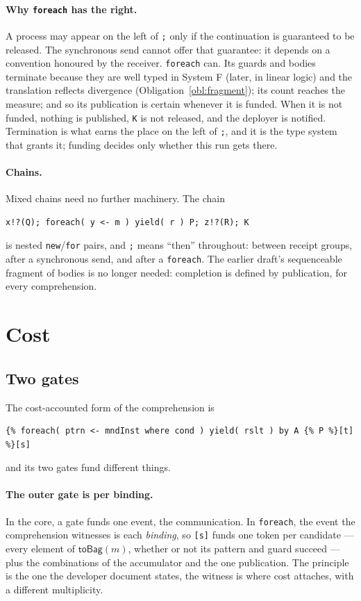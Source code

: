 \documentclass[11pt]{article}
\theoremstyle{branddef}
\theoremstyle{brandplain}
\theoremstyle{brandrem}
\newcommand{\fe}{\texttt{foreach}}
\begin{document}
\paragraph{Why \fe{} has the right.} A process may appear on the left of
\texttt{;} only if the continuation is guaranteed to be released. The
synchronous send cannot offer that guarantee: it depends on a convention
honoured by the receiver. \fe{} can. Its guards and bodies terminate because
they are well typed in System F (later, in linear logic) and the translation
reflects divergence (Obligation~\ref{obl:fragment}); its count reaches the
measure; and so its publication is certain whenever it is funded. When it is
not funded, nothing is published, \texttt{K} is not released, and the deployer
is notified. Termination is what earns the place on the left of \texttt{;}, and
it is the type system that grants it; funding decides only whether this run
gets there.

\paragraph{Chains.} Mixed chains need no further machinery. The chain
\begin{lstlisting}
x!?(Q); foreach( y <- m ) yield( r ) P; z!?(R); K
\end{lstlisting}
is nested \texttt{new}/\texttt{for} pairs, and \texttt{;} means ``then''
throughout: between receipt groups, after a synchronous send, and after a
\fe{}. The earlier draft's sequenceable fragment of bodies is no longer needed:
completion is defined by publication, for every comprehension.

\section{Cost}
\label{sec:cost}

\subsection{Two gates}

The cost-accounted form of the comprehension is
\begin{lstlisting}
{% foreach( ptrn <- mndInst where cond ) yield( rslt ) by A {% P %}[t] %}[s]
\end{lstlisting}
and its two gates fund different things.

\paragraph{The outer gate is per binding.} In the core, a gate funds one event,
the communication. In \fe{}, the event the comprehension witnesses is each
\emph{binding}, so \texttt{[s]} funds one token per candidate --- every element
of \(\mathsf{toBag}(m)\), whether or not its pattern and guard succeed --- plus
the combinations of the accumulator and the one publication. The principle is
the one the developer document states, the witness is where cost attaches, with
a different multiplicity.
\end{document}
